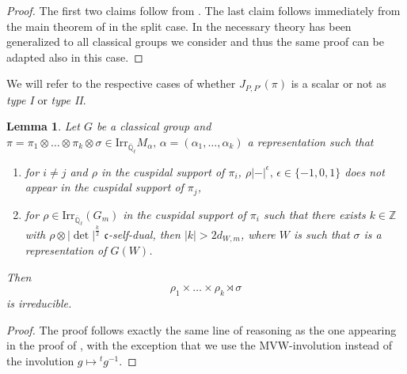 \documentclass[10pt,a4paper]{article}
\newtheorem{lemma}{Lemma}
\theoremstyle{remark}
\theoremstyle{definition}
\newcommand{\ql}{{\overline{\mathbb{Q}}_\ell}}
\newcommand{\irr}{\mathrm{Irr}}
\newcommand{\ZZ}{\mathbb{Z}}
\newcommand{\fc}{\mathfrak{c}}
\begin{document}
\begin{proof}
    The first two claims follow from \cite[Proposition 8.4]{Dat05}. The last claim follows immediately from the  main theorem of \cite{moeglin2002points} in the split case. In \cite{atobe2024local} the necessary theory has been generalized to all classical groups we consider and thus the same proof can be adapted also in this case.
\end{proof}
We will refer to the respective cases of whether $J_{P,P'}(\pi)$ is a scalar or not as \emph{type I} or \emph{type II}.
\begin{lemma}\label{L:shiftG}
    Let $G$ be a classical group and $\pi=\pi_1\otimes\ldots\otimes\pi_k\otimes \sigma\in\irr_\ql M_\alpha,\,\alpha=(\alpha_1,\ldots,\alpha_k)$ a representation such that
    \begin{enumerate}
        \item for $i\neq j$ and $\rho$ in the cuspidal support of $\pi_i$, $\rho\lvert-\lvert^\epsilon,\,\epsilon\in\{-1,0,1\}$ does not appear in the cuspidal support of $\pi_j$,
        \item for $\rho\in\irr_\ql(G_m)$ in the cuspidal support of $\pi_i$ such that there exists $k\in \ZZ$ with $\rho\otimes\lvert\det\rvert^\frac{k}{2}$ $\fc$-self-dual, then $\lvert k\lvert> 2d_{W,m}$, where $W$ is such that $\sigma $ is a representation of $G(W)$.
    \end{enumerate} Then
    \[\rho_1\times\ldots\times\rho_k\rtimes\sigma\]
    is irreducible.
\end{lemma}
\begin{proof}
    The proof follows exactly the same line of reasoning as the one appearing in the proof of , with the exception that we use the MVW-involution instead of the involution $g\mapsto {}^tg^{-1}$.
\end{proof}
\end{document}
